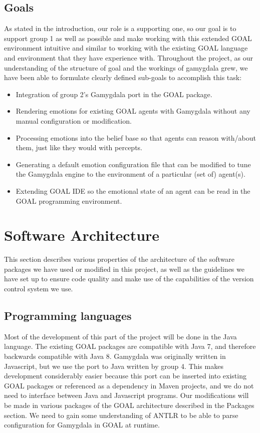 \documentclass[]{article}
\begin{document}
\subsection{Goals}
As stated in the introduction, our role is a supporting one, so our goal is to support group 1 as well as possible and make working with this extended GOAL environment intuitive and similar to working with the existing GOAL language and environment that they have experience with.
Throughout the project, as our understanding of the structure of goal and the workings of gamygdala grew, we have been able to formulate clearly defined sub-goals to accomplish this task:
\begin{itemize}
  \item Integration of group 2's Gamygdala port in the GOAL package.
  \item Rendering emotions for existing GOAL agents with Gamygdala without any manual configuration or modification.
  \item Processing emotions into the belief base so that agents can reason with/about them, just like they would with percepts.
  \item Generating a default emotion configuration file that can be modified to tune the Gamygdala engine to the environment of a particular (set of) agent(s).
  \item Extending GOAL IDE so the emotional state of an agent can be read in the GOAL programming environment.
\end{itemize}

\section{Software Architecture}
This section describes various properties of the architecture of the software packages we have used or modified in this project, as well as the guidelines we have set up to ensure code quality and make use of the capabilities of the version control system we use.
\subsection{Programming languages}
Most of the development of this part of the project will be done in the Java language. The existing GOAL packages are compatible with Java 7, and therefore backwards compatible with Java 8. Gamygdala was originally written in Javascript, but we use the port to Java written by group 4. This makes development considerably easier because this port can be inserted into existing GOAL packages or referenced as a dependency in Maven projects, and we do not need to interface between Java and Javascript programs. Our modifications will be made in various packages of the GOAL architecture described in the Packages section. We need to gain some understanding of \gls{ANTLR} to be able to parse configuration for Gamygdala in GOAL at runtime. 
\end{document}
